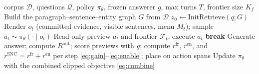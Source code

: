\documentclass[letterpaper]{article} %
\begin{document}
\begin{algorithm}[t]
\caption{Harness-G rollout and training.}
\label{alg:training}
\begin{algorithmic}[1]
\REQUIRE corpus $\mathcal{D}$, questions $\mathcal{Q}$, policy $\pi_\theta$, frozen answerer $g$, max turns $T$, frontier size $K_f$
\STATE Build the paragraph--sentence--entity graph $G$ from $\mathcal{D}$
    \STATE $z_0 \leftarrow \mathrm{InitRetrieve}(q;G)$
      \STATE Render $o_t$ (committed evidence, visible sentences, menu $M_t$); sample $a_t\sim\pi_\theta(\cdot\mid o_t)$
      \STATE Read-only preview $a_t$ and frontier $\mathcal{F}_t$; execute $a_t$
       \STATE \textbf{break} \ENDIF
    \ENDFOR
    \STATE Generate answer; compute $R^{\mathrm{out}}$; score previews with $g$; compute $r^{\mathrm{fr}}$, $r^{\mathrm{en}}$, and $r^{\mathrm{SNC}}=r^{\mathrm{fr}}+r^{\mathrm{en}}$ per step \eqref{eq:gain}--\eqref{eq:enable}; place on action spans
  \ENDFOR
  \STATE Update $\pi_\theta$ with the combined clipped objective \eqref{eq:combine}
\ENDFOR
\end{algorithmic}
\end{algorithm}
\end{document}

